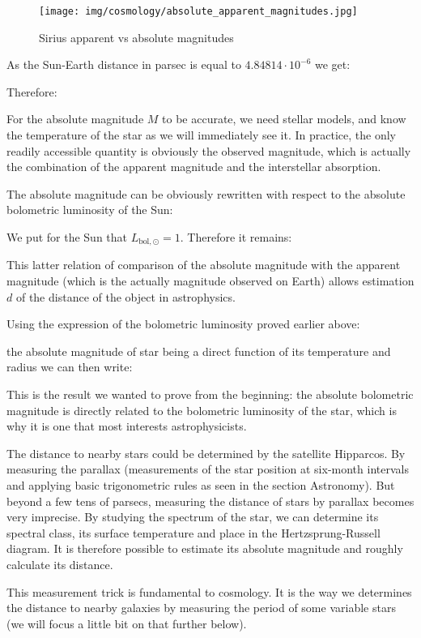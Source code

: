 	\begin{figure}[H]
		\centering
		\texttt{[image: img/cosmology/absolute\_apparent\_magnitudes.jpg]}	
		\caption{Sirius apparent vs absolute magnitudes}
	\end{figure}
	As the Sun-Earth distance in parsec is equal to $4.84814\cdot 10^{-6}$  we get:
	
	Therefore:
	
	\begin{tcolorbox}[title=Remark,colframe=black,arc=10pt]
	For the absolute magnitude $M$ to be accurate, we need stellar models, and know the temperature of the star as we will immediately see it. In practice, the only readily accessible quantity is obviously the observed magnitude, which is actually the combination of the apparent magnitude and the interstellar absorption.
	\end{tcolorbox}
	The absolute magnitude can be obviously rewritten with respect to the absolute bolometric luminosity of the Sun:	
	
	We put for the Sun that $L_{\text{bol},\odot}=1$. Therefore it remains:
	
	
	This latter relation of comparison of the absolute magnitude with the apparent magnitude (which is the actually magnitude observed on Earth) allows estimation $d$ of the distance of the object in astrophysics.
	
	Using the expression of the bolometric luminosity proved earlier above:
	
	the absolute magnitude of star being a direct function of its temperature and radius we can then write:
	
	This is the result we wanted to prove from the beginning: the absolute bolometric magnitude is directly related to the bolometric luminosity of the star, which is why it is one that most interests astrophysicists.
	\begin{tcolorbox}[title=Remark,colframe=black,arc=10pt]
	The distance to nearby stars could be determined by the satellite Hipparcos. By measuring the parallax (measurements of the star position at six-month intervals and applying basic trigonometric rules as seen in the section Astronomy). But beyond a few tens of parsecs, measuring the distance of stars by parallax becomes very imprecise. By studying the spectrum of the star, we can determine its spectral class, its surface temperature and place in the Hertzsprung-Russell diagram. It is therefore possible to estimate its absolute magnitude and roughly calculate its distance.
	\end{tcolorbox}
	This measurement trick is fundamental to cosmology. It is the way we determines the distance to nearby galaxies by measuring the period of some variable stars (we will focus a little bit on that further below).

